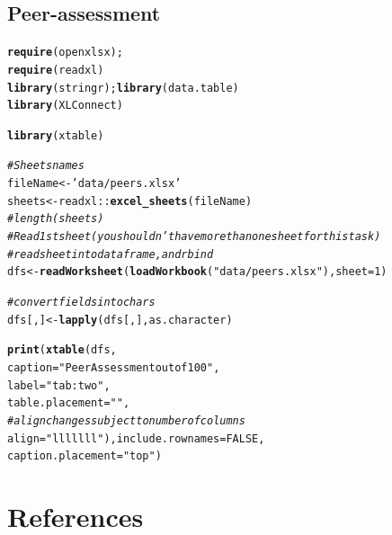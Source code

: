 \documentclass[10pt]{article}\usepackage[]{graphicx}\usepackage[]{color}
\makeatletter
\newcommand{\hlnum}[1]{\textcolor[rgb]{0.686,0.059,0.569}{#1}}%
\newcommand{\hlstr}[1]{\textcolor[rgb]{0.192,0.494,0.8}{#1}}%
\newcommand{\hlcom}[1]{\textcolor[rgb]{0.678,0.584,0.686}{\textit{#1}}}%
\newcommand{\hlopt}[1]{\textcolor[rgb]{0,0,0}{#1}}%
\newcommand{\hlstd}[1]{\textcolor[rgb]{0.345,0.345,0.345}{#1}}%
\newcommand{\hlkwb}[1]{\textcolor[rgb]{0.69,0.353,0.396}{#1}}%
\newcommand{\hlkwc}[1]{\textcolor[rgb]{0.333,0.667,0.333}{#1}}%
\newcommand{\hlkwd}[1]{\textcolor[rgb]{0.737,0.353,0.396}{\textbf{#1}}}%
\newenvironment{kframe}{%
 \def\at@end@of@kframe{}%
 \ifinner\ifhmode%
  \def\at@end@of@kframe{\end{minipage}}%
  \begin{minipage}{\columnwidth}%
 \fi\fi%
 \def\FrameCommand##1{\hskip\@totalleftmargin \hskip-\fboxsep
 \colorbox{shadecolor}{##1}\hskip-\fboxsep
     \hskip-\linewidth \hskip-\@totalleftmargin \hskip\columnwidth}%
 \MakeFramed {\advance\hsize-\width
   \@totalleftmargin\z@ \linewidth\hsize
   \@setminipage}}%
 {\par\unskip\endMakeFramed%
 \at@end@of@kframe}
\makeatother
\begin{document}
\subsection{Peer-assessment}

\begin{kframe}
\begin{alltt}
\hlkwd{require}\hlstd{(openxlsx);}
\hlkwd{require}\hlstd{(readxl)}
\hlkwd{library}\hlstd{(stringr);}\hlkwd{library}\hlstd{(data.table)}
\hlkwd{library}\hlstd{(XLConnect)}
\end{alltt}


{\ttfamily\noindent\bfseries\color{errorcolor}{\#\# Error: package or namespace load failed for 'XLConnect':\\\#\#\ \ .onLoad failed in loadNamespace() for 'rJava', details:\\\#\#\ \  call: fun(libname, pkgname)\\\#\#\ \  error: JAVA\_HOME cannot be determined from the Registry}}\begin{alltt}
\hlkwd{library}\hlstd{(xtable)}

\hlcom{# Sheets names }
\hlstd{fileName} \hlkwb{<-} \hlstr{'data/peers.xlsx'}
\hlstd{sheets} \hlkwb{<-} \hlstd{readxl}\hlopt{::}\hlkwd{excel_sheets}\hlstd{(fileName)}
\hlcom{#length(sheets)}
\hlcom{# Read 1st sheet (you shouldn't have more than one sheet for this task)}
\hlcom{# read sheet into dataframe, and rbind}
\hlstd{dfs} \hlkwb{<-} \hlkwd{readWorksheet}\hlstd{(}\hlkwd{loadWorkbook}\hlstd{(}\hlstr{"data/peers.xlsx"}\hlstd{),}\hlkwc{sheet}\hlstd{=}\hlnum{1}\hlstd{)}
\end{alltt}


{\ttfamily\noindent\bfseries{}}\begin{alltt}
\hlcom{# convert fields into chars}
\hlstd{dfs[, ]} \hlkwb{<-} \hlkwd{lapply}\hlstd{(dfs[, ], as.character)}
\end{alltt}


{\ttfamily\noindent\bfseries\color{errorcolor}{\#\# Error in lapply(dfs[, ], as.character): object 'dfs' not found}}\begin{alltt}
\hlkwd{print}\hlstd{(}\hlkwd{xtable}\hlstd{(dfs,}
                    \hlkwc{caption} \hlstd{=} \hlstr{"Peer Assessment out of 100"}\hlstd{,}
                    \hlkwc{label} \hlstd{=} \hlstr{"tab:two"}\hlstd{,}
                    \hlkwc{table.placement} \hlstd{=} \hlstr{""}\hlstd{,}
                    \hlcom{# align changes subject to number of columns }
                    \hlkwc{align} \hlstd{=} \hlstr{"lllllll"}\hlstd{),}\hlkwc{include.rownames}\hlstd{=}\hlnum{FALSE}\hlstd{,}
                    \hlkwc{caption.placement} \hlstd{=} \hlstr{"top"}\hlstd{)}
\end{alltt}


{\ttfamily\noindent\bfseries{}}\end{kframe}


\pagebreak
\section*{References}\label{pubs}
\printbibliography[heading=none]
\end{document}
